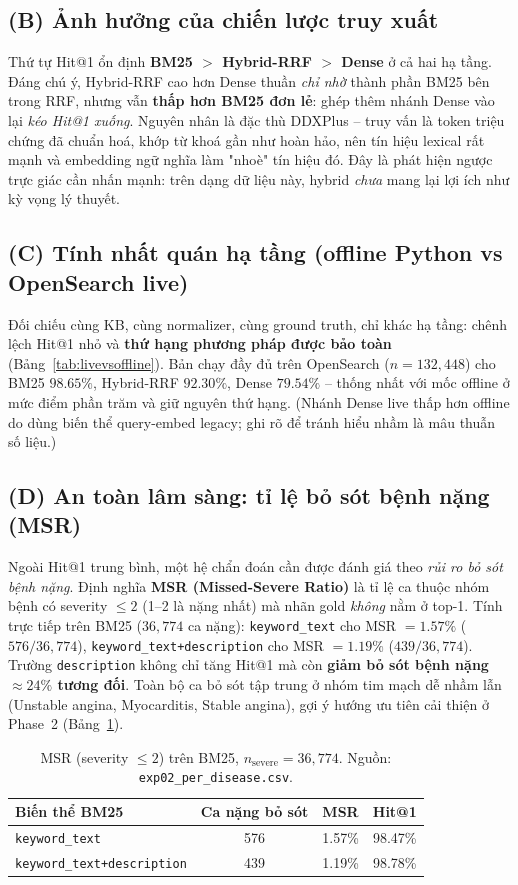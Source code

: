 \documentclass[11pt,a4paper]{article}
\begin{document}
\subsection*{(B) Ảnh hưởng của chiến lược truy xuất}
Thứ tự Hit@1 ổn định \textbf{BM25 $>$ Hybrid-RRF $>$ Dense} ở cả hai hạ tầng.
Đáng chú ý, Hybrid-RRF cao hơn Dense thuần \emph{chỉ nhờ} thành phần BM25 bên
trong RRF, nhưng vẫn \textbf{thấp hơn BM25 đơn lẻ}: ghép thêm nhánh Dense vào lại
\emph{kéo Hit@1 xuống}. Nguyên nhân là đặc thù DDXPlus -- truy vấn là token triệu
chứng đã chuẩn hoá, khớp từ khoá gần như hoàn hảo, nên tín hiệu lexical rất mạnh
và embedding ngữ nghĩa làm "nhoè" tín hiệu đó. Đây là phát hiện ngược trực giác
cần nhấn mạnh: trên dạng dữ liệu này, hybrid \emph{chưa} mang lại lợi ích như kỳ
vọng lý thuyết.

\subsection*{(C) Tính nhất quán hạ tầng (offline Python vs OpenSearch live)}
Đối chiếu cùng KB, cùng normalizer, cùng ground truth, chỉ khác hạ tầng: chênh
lệch Hit@1 nhỏ và \textbf{thứ hạng phương pháp được bảo toàn}
(Bảng~\ref{tab:livevsoffline}). Bản chạy đầy đủ trên OpenSearch ($n=132{,}448$)
cho BM25 $98.65\%$, Hybrid-RRF $92.30\%$, Dense $79.54\%$ -- thống nhất với mốc
offline ở mức điểm phần trăm và giữ nguyên thứ hạng. (Nhánh Dense live thấp hơn
offline do dùng biến thể query-embed legacy; ghi rõ để tránh hiểu nhầm là mâu
thuẫn số liệu.)

\subsection*{(D) An toàn lâm sàng: tỉ lệ bỏ sót bệnh nặng (MSR)}
Ngoài Hit@1 trung bình, một hệ chẩn đoán cần được đánh giá theo \emph{rủi ro bỏ
sót bệnh nặng}. Định nghĩa \textbf{MSR (Missed-Severe Ratio)} là tỉ lệ ca thuộc
nhóm bệnh có severity $\le 2$ (1--2 là nặng nhất) mà nhãn gold \emph{không} nằm ở
top-1. Tính trực tiếp trên BM25 ($36{,}774$ ca nặng):
\texttt{keyword\_text} cho MSR $=1.57\%$ ($576/36{,}774$),
\texttt{keyword\_text+description} cho MSR $=1.19\%$ ($439/36{,}774$).
Trường \texttt{description} không chỉ tăng Hit@1 mà còn \textbf{giảm bỏ sót bệnh
nặng $\approx 24\%$ tương đối}. Toàn bộ ca bỏ sót tập trung ở nhóm tim mạch dễ
nhầm lẫn (Unstable angina, Myocarditis, Stable angina), gợi ý hướng ưu tiên cải
thiện ở Phase~2 (Bảng~\ref{tab:msr}).

\begin{table}[H]
\centering
\small
\caption{MSR (severity $\le 2$) trên BM25, $n_{\text{severe}}=36{,}774$. Nguồn:
\texttt{exp02\_per\_disease.csv}.}
\label{tab:msr}
\begin{tabular}{lccc}
\hline
\textbf{Biến thể BM25} & \textbf{Ca nặng bỏ sót} & \textbf{MSR} & \textbf{Hit@1}\\
\hline
\texttt{keyword\_text}              & 576 & 1.57\% & 98.47\%\\
\texttt{keyword\_text+description}  & 439 & 1.19\% & 98.78\%\\
\hline
\end{tabular}
\end{table}
\end{document}
